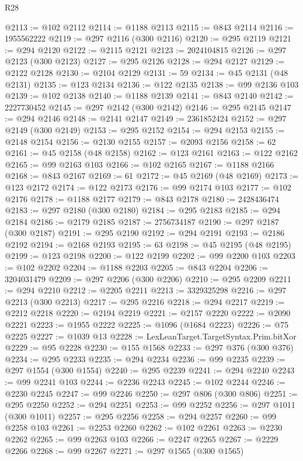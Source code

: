 \begin{lexlean}{R28}
\begin{coremodule}
@2113 := @102 @2112
@2114 := @1188 @2113
@2115 := @843 @2114
@2116 := 1955562222
@2119 := @297 @2116 (@300 @2116)
@2120 := @295 @2119
@2121 := @294 @2120
@2122 := @2115 @2121
@2123 := 2024104815
@2126 := @297 @2123 (@300 @2123)
@2127 := @295 @2126
@2128 := @294 @2127
@2129 := @2122 @2128
@2130 := @2104 @2129
@2131 := 59
@2134 := @45 @2131 (@48 @2131)
@2135 := @123 @2134
@2136 := @122 @2135
@2138 := @99 @2136 @103
@2139 := @102 @2138
@2140 := @1188 @2139
@2141 := @843 @2140
@2142 := 2227730452
@2145 := @297 @2142 (@300 @2142)
@2146 := @295 @2145
@2147 := @294 @2146
@2148 := @2141 @2147
@2149 := 2361852424
@2152 := @297 @2149 (@300 @2149)
@2153 := @295 @2152
@2154 := @294 @2153
@2155 := @2148 @2154
@2156 := @2130 @2155
@2157 := @2093 @2156
@2158 := 62
@2161 := @45 @2158 (@48 @2158)
@2162 := @123 @2161
@2163 := @122 @2162
@2165 := @99 @2163 @103
@2166 := @102 @2165
@2167 := @1188 @2166
@2168 := @843 @2167
@2169 := 61
@2172 := @45 @2169 (@48 @2169)
@2173 := @123 @2172
@2174 := @122 @2173
@2176 := @99 @2174 @103
@2177 := @102 @2176
@2178 := @1188 @2177
@2179 := @843 @2178
@2180 := 2428436474
@2183 := @297 @2180 (@300 @2180)
@2184 := @295 @2183
@2185 := @294 @2184
@2186 := @2179 @2185
@2187 := 2756734187
@2190 := @297 @2187 (@300 @2187)
@2191 := @295 @2190
@2192 := @294 @2191
@2193 := @2186 @2192
@2194 := @2168 @2193
@2195 := 63
@2198 := @45 @2195 (@48 @2195)
@2199 := @123 @2198
@2200 := @122 @2199
@2202 := @99 @2200 @103
@2203 := @102 @2202
@2204 := @1188 @2203
@2205 := @843 @2204
@2206 := 3204031479
@2209 := @297 @2206 (@300 @2206)
@2210 := @295 @2209
@2211 := @294 @2210
@2212 := @2205 @2211
@2213 := 3329325298
@2216 := @297 @2213 (@300 @2213)
@2217 := @295 @2216
@2218 := @294 @2217
@2219 := @2212 @2218
@2220 := @2194 @2219
@2221 := @2157 @2220
@2222 := @2090 @2221
@2223 := @1955 @2222
@2225 := @1096 (@1684 @2223)
@2226 := @75 @2225
@2227 := @1039 @13
@2228 := LexLeanTarget.TargetSyntax.Prim.bitXor
@2229 := @95 @2228
@2230 := @155 @1568
@2233 := @297 @376 (@300 @376)
@2234 := @295 @2233
@2235 := @294 @2234
@2236 := @99 @2235
@2239 := @297 @1554 (@300 @1554)
@2240 := @295 @2239
@2241 := @294 @2240
@2243 := @99 @2241 @103
@2244 := @2236 @2243
@2245 := @102 @2244
@2246 := @2230 @2245
@2247 := @99 @2246
@2250 := @297 @806 (@300 @806)
@2251 := @295 @2250
@2252 := @294 @2251
@2253 := @99 @2252
@2256 := @297 @1011 (@300 @1011)
@2257 := @295 @2256
@2258 := @294 @2257
@2260 := @99 @2258 @103
@2261 := @2253 @2260
@2262 := @102 @2261
@2263 := @2230 @2262
@2265 := @99 @2263 @103
@2266 := @2247 @2265
@2267 := @2229 @2266
@2268 := @99 @2267
@2271 := @297 @1565 (@300 @1565)

\end{coremodule}
\end{lexlean}
